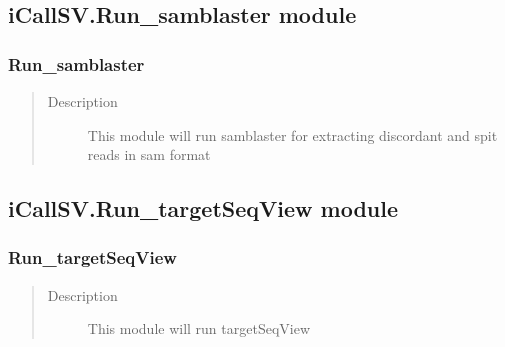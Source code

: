 \documentclass[letterpaper,10pt,english]{sphinxmanual}
\begin{document}
\subsection{iCallSV.Run\_samblaster module}
\label{iCallSV:icallsv-run-samblaster-module}\label{iCallSV:module-iCallSV.Run_samblaster}

\subsubsection{Run\_samblaster}
\label{iCallSV:run-samblaster}\begin{quote}\begin{description}
\item[{Description}] \leavevmode
This module will run samblaster for extracting discordant and spit reads in sam format

\end{description}\end{quote}

\begin{fulllineitems}
\label{iCallSV:iCallSV.Run_samblaster.run}
\end{fulllineitems}



\subsection{iCallSV.Run\_targetSeqView module}
\label{iCallSV:module-iCallSV.Run_targetSeqView}\label{iCallSV:icallsv-run-targetseqview-module}

\subsubsection{Run\_targetSeqView}
\label{iCallSV:run-targetseqview}\begin{quote}\begin{description}
\item[{Description}] \leavevmode
This module will run targetSeqView

\end{description}\end{quote}
\end{document}
